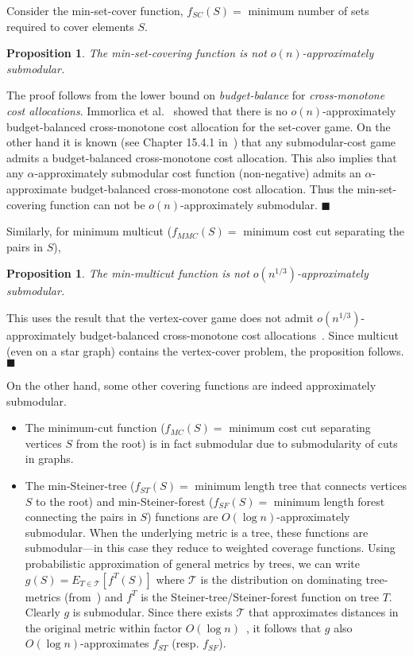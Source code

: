 \documentclass[11pt,letterpaper]{article}
\newtheorem{proposition}[theorem]{Proposition}
\newenvironment{proof}{

\noindent{\bf Proof:}} {\hfill$\blacksquare$


}
\begin{document}
Consider the min-set-cover function, $f_{SC}(S)=$ minimum number of sets required to cover elements $S$.
\begin{proposition}
The min-set-covering function is not $o(n)$-approximately submodular.
\end{proposition}
\begin{proof}
The proof follows from the lower bound on {\em budget-balance} for {\em cross-monotone cost allocations}. Immorlica et
al.~\cite{IMM08} showed that there is no $o(n)$-approximately budget-balanced cross-monotone cost allocation for the
set-cover game. On the other hand it is known (see Chapter 15.4.1 in~\cite{AlgGameThy-book}) that any submodular-cost
game admits a budget-balanced cross-monotone cost allocation. This also implies that any $\alpha$-approximately
submodular cost function (non-negative) admits an $\alpha$-approximate budget-balanced cross-monotone cost allocation.
Thus the min-set-covering function can not be $o(n)$-approximately submodular.
\end{proof}

Similarly, for minimum multicut ($f_{MMC}(S)=$ minimum cost cut separating the pairs in $S$),
\begin{proposition}
The min-multicut function is not $o(n^{1/3})$-approximately submodular.
\end{proposition}
\begin{proof}
This uses the result that the vertex-cover game does not admit $o(n^{1/3})$-approximately budget-balanced
cross-monotone cost allocations~\cite{IMM08}. Since multicut (even on a star graph) contains the vertex-cover problem,
the proposition follows.
\end{proof}

On the other hand, some other covering functions are indeed approximately submodular.
\begin{itemize}
\item The minimum-cut function ($f_{MC}(S)=$ minimum cost cut separating vertices $S$ from the root) is in fact submodular due to
submodularity of cuts in graphs.
\item The min-Steiner-tree ($f_{ST}(S)=$ minimum length tree that connects vertices
$S$ to the root) and min-Steiner-forest ($f_{SF}(S)=$ minimum length forest connecting the pairs in $S$) functions are
$O(\log n)$-approximately submodular. When the underlying metric is a tree, these functions are submodular---in this
case they reduce to weighted coverage functions. Using probabilistic approximation of general metrics by trees, we can
write $g(S)=E_{T\in \mathcal{T}}[f^{T}(S)]$ where $\mathcal{T}$ is the distribution on dominating tree-metrics
(from~\cite{FRT03}) and $f^T$ is the Steiner-tree/Steiner-forest function on tree $T$. Clearly $g$ is submodular. Since
there exists $\mathcal{T}$ that approximates distances in the original metric within factor $O(\log n)$~\cite{FRT03},
it follows that $g$ also $O(\log n)$-approximates $f_{ST}$ (resp. $f_{SF}$).
\end{itemize}
\end{document}
